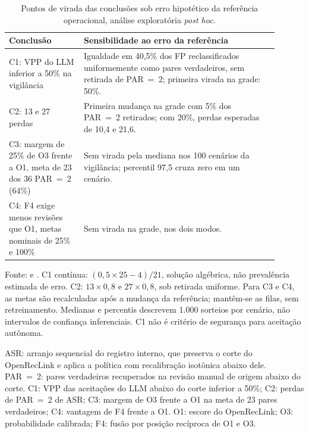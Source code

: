 \begin{table}[!htbp]
\centering
\caption{Pontos de virada das conclusões sob erro hipotético da referência operacional, análise exploratória \textit{post hoc}.}
\label{tab:cap8-vies-referencia}
\small
\begin{tabular}{p{0.25\linewidth}p{0.65\linewidth}}
\toprule
Conclusão & Sensibilidade ao erro da referência \\
\midrule
C1: VPP do LLM inferior a 50\% na vigilância & Igualdade em 40,5\% dos FP reclassificados uniformemente como pares verdadeiros, sem retirada de PAR~=~2; primeira virada na grade: 50\%. \\
C2: 13 e 27 perdas & Primeira mudança na grade com 5\% dos PAR~=~2 retirados; com 20\%, perdas esperadas de 10,4 e 21,6. \\
C3: margem de 25\% de O3 frente a O1, meta de 23 dos 36 PAR~=~2 (64\%) & Sem virada pela mediana nos 100 cenários da vigilância; percentil 97,5 cruza zero em um cenário. \\
C4: F4 exige menos revisões que O1, metas nominais de 25\% e 100\% & Sem virada na grade, nos dois modos. \\
\bottomrule
\end{tabular}
\par\footnotesize Fonte:  e . C1 contínua: $(0{,}5\times25-4)/21$, solução algébrica, não prevalência estimada de erro. C2: $13\times0{,}8$ e $27\times0{,}8$, sob retirada uniforme. Para C3 e C4, as metas são recalculadas após a mudança da referência; mantêm-se as filas, sem retreinamento. Medianas e percentis descrevem 1.000 sorteios por cenário, não intervalos de confiança inferenciais. C1 não é critério de segurança para aceitação autônoma.
\par\footnotesize ASR: arranjo sequencial do registro interno, que preserva o corte do OpenRecLink e aplica a política com recalibração isotônica abaixo dele. PAR~=~2: pares verdadeiros recuperados na revisão manual de origem abaixo do corte. C1: VPP das aceitações do LLM abaixo do corte inferior a 50\%; C2: perdas de PAR~=~2 de ASR; C3: margem de O3 frente a O1 na meta de 23 pares verdadeiros; C4: vantagem de F4 frente a O1. O1: escore do OpenRecLink; O3: probabilidade calibrada; F4: fusão por posição recíproca de O1 e O3.
\end{table}
